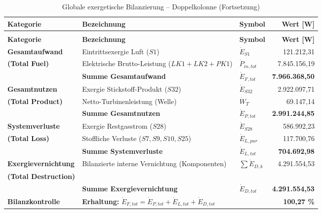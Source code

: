 \begin{longtable}{lllr}
\caption{Globale exergetische Bilanzierung -- Doppelkolonnenmodell}
\label{tab:globale_bilanz_doppel_final} \\
\hline
\textbf{Kategorie} & \textbf{Bezeichnung} & \textbf{Symbol} & \textbf{Wert [W]} \\
\hline
\endfirsthead
\caption[]{Globale exergetische Bilanzierung -- Doppelkolonne (Fortsetzung)} \\
\hline
\textbf{Kategorie} & \textbf{Bezeichnung} & \textbf{Symbol} & \textbf{Wert [W]} \\
\hline
\endhead
\hline
\endfoot

\textbf{Gesamtaufwand} & Eintrittsexergie Luft ($S1$) & $\dot{E}_{S1}$ & 121.212,31 \\
\textbf{(Total Fuel)} & Elektrische Brutto-Leistung ($LK1+LK2+PK1$) & $\dot{P}_{in,tot}$ & 7.845.156,19 \\
\cline{2-4}
& \textbf{Summe Gesamtaufwand} & $\dot{E}_{F,tot}$ & \textbf{7.966.368,50} \\
\hline

\textbf{Gesamtnutzen} & Exergie Stickstoff-Produkt ($S32$) & $\dot{E}_{S32}$ & 2.922.097,71 \\
\textbf{(Total Product)} & Netto-Turbinenleistung (Welle) & $\dot{W}_{T}$ & 69.147,14 \\
\cline{2-4}
& \textbf{Summe Gesamtnutzen} & $\dot{E}_{P,tot}$ & \textbf{2.991.244,85} \\
\hline

\textbf{Systemverluste} & Exergie Restgasstrom ($S28$) & $\dot{E}_{S28}$ & 586.992,23 \\
\textbf{(Total Loss)} & Stoffliche Verluste ($S7, S9, S10, S25$) & $\dot{E}_{L,pur}$ & 117.700,76 \\
\cline{2-4}
& \textbf{Summe Systemverluste} & $\dot{E}_{L,tot}$ & \textbf{704.692,98} \\
\hline

\textbf{Exergievernichtung} & Bilanzierte interne Vernichtung (Komponenten) & $\sum \dot{E}_{D,k}$ & 4.291.554,53 \\
\textbf{(Total Destruction)} &  &  & \\
\cline{2-4}
& \textbf{Summe Exergievernichtung} & $\dot{E}_{D,tot}$ & \textbf{4.291.554,53} \\
\hline

\textbf{Bilanzkontrolle} & \textbf{Erhaltung: } $\dot{E}_{F,tot} = \dot{E}_{P,tot} + \dot{E}_{L,tot} + \dot{E}_{D,tot}$ & & \textbf{100,27 \%} \\
\hline
\end{longtable}